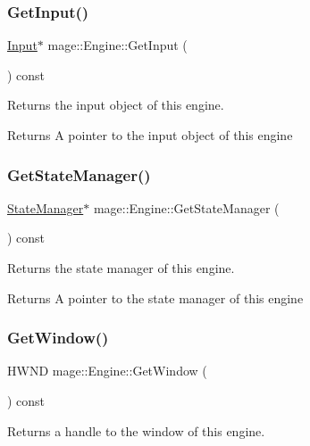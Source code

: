 \subsubsection{\texorpdfstring{Get\+Input()}{GetInput()}}
{\footnotesize\ttfamily \hyperlink{classmage_1_1_input}{Input}$\ast$ mage\+::\+Engine\+::\+Get\+Input (\begin{DoxyParamCaption}{ }\end{DoxyParamCaption}) const}

Returns the input object of this engine.

\begin{DoxyReturn}{Returns}
A pointer to the input object of this engine 
\end{DoxyReturn}
\hypertarget{classmage_1_1_engine_a4f35bccc3784de531245a2549d537745}{}\label{classmage_1_1_engine_a4f35bccc3784de531245a2549d537745} 
\subsubsection{\texorpdfstring{Get\+State\+Manager()}{GetStateManager()}}
{\footnotesize\ttfamily \hyperlink{classmage_1_1_state_manager}{State\+Manager}$\ast$ mage\+::\+Engine\+::\+Get\+State\+Manager (\begin{DoxyParamCaption}{ }\end{DoxyParamCaption}) const}

Returns the state manager of this engine.

\begin{DoxyReturn}{Returns}
A pointer to the state manager of this engine 
\end{DoxyReturn}
\hypertarget{classmage_1_1_engine_a1c5f9d8c68045b36f404251359aa41e4}{}\label{classmage_1_1_engine_a1c5f9d8c68045b36f404251359aa41e4} 
\subsubsection{\texorpdfstring{Get\+Window()}{GetWindow()}}
{\footnotesize\ttfamily H\+W\+ND mage\+::\+Engine\+::\+Get\+Window (\begin{DoxyParamCaption}{ }\end{DoxyParamCaption}) const}

Returns a handle to the window of this engine. \hypertarget{classmage_1_1_engine_afdc05e214d3f47a6ea3a40dfffd86f80}{}\label{classmage_1_1_engine_afdc05e214d3f47a6ea3a40dfffd86f80} 
